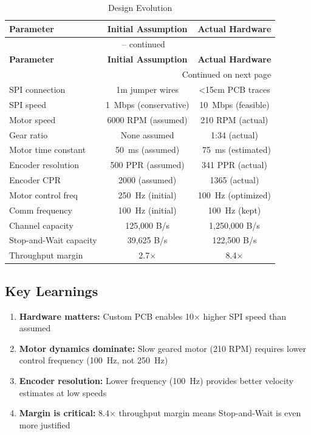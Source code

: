 \documentclass[12pt,letterpaper]{article}
\begin{document}
\begin{longtable}{lcc}
\caption{Design Evolution} \\
\toprule
\textbf{Parameter} & \textbf{Initial Assumption} & \textbf{Actual Hardware} \\
\midrule
\endfirsthead
\multicolumn{3}{c}{{\tablename\ \thetable{} -- continued}} \\
\toprule
\textbf{Parameter} & \textbf{Initial Assumption} & \textbf{Actual Hardware} \\
\midrule
\endhead
\midrule
\multicolumn{3}{r}{{Continued on next page}} \\
\endfoot
\bottomrule
\endlastfoot
SPI connection & 1m jumper wires & <15cm PCB traces \\
SPI speed & 1~Mbps (conservative) & 10~Mbps (feasible) \\
Motor speed & 6000 RPM (assumed) & 210 RPM (actual) \\
Gear ratio & None assumed & 1:34 (actual) \\
Motor time constant & 50~ms (assumed) & ~75~ms (estimated) \\
Encoder resolution & 500 PPR (assumed) & 341 PPR (actual) \\
Encoder CPR & 2000 (assumed) & 1365 (actual) \\
Motor control freq & 250~Hz (initial) & 100~Hz (optimized) \\
Comm frequency & 100~Hz (initial) & 100~Hz (kept) \\
Channel capacity & 125,000 B/s & 1,250,000 B/s \\
Stop-and-Wait capacity & 39,625 B/s & 122,500 B/s \\
Throughput margin & 2.7× & 8.4× \\
\end{longtable}

\subsection{Key Learnings}

\begin{enumerate}
    \item \textbf{Hardware matters:} Custom PCB enables 10× higher SPI speed than assumed
    \item \textbf{Motor dynamics dominate:} Slow geared motor (210 RPM) requires lower control frequency (100~Hz, not 250~Hz)
    \item \textbf{Encoder resolution:} Lower frequency (100~Hz) provides better velocity estimates at low speeds
    \item \textbf{Margin is critical:} 8.4× throughput margin means Stop-and-Wait is even more justified
\end{enumerate}
\end{document}
